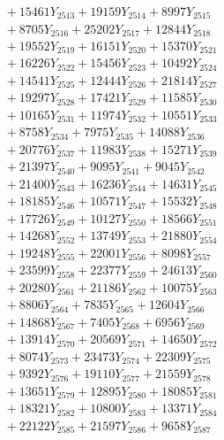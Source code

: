 \documentclass[a4paper,10pt]{article}
\begin{document}
{\begin{align}
&\;  + 15461 Y_{2513} + 19159 Y_{2514} + 8997 Y_{2515} \\[0.3ex]
&\;  + 8705 Y_{2516} + 25202 Y_{2517} + 12844 Y_{2518} \\[0.5ex]\allowbreak
&\;  + 19552 Y_{2519} + 16151 Y_{2520} + 15370 Y_{2521} \\[0.3ex]
&\;  + 16226 Y_{2522} + 15456 Y_{2523} + 10492 Y_{2524} \\[0.3ex]
&\;  + 14541 Y_{2525} + 12444 Y_{2526} + 21814 Y_{2527} \\[0.3ex]
&\;  + 19297 Y_{2528} + 17421 Y_{2529} + 11585 Y_{2530} \\[0.3ex]
&\;  + 10165 Y_{2531} + 11974 Y_{2532} + 10551 Y_{2533} \\[0.3ex]
&\;  + 8758 Y_{2534} + 7975 Y_{2535} + 14088 Y_{2536} \\[0.3ex]
&\;  + 20776 Y_{2537} + 11983 Y_{2538} + 15271 Y_{2539} \\[0.3ex]
&\;  + 21397 Y_{2540} + 9095 Y_{2541} + 9045 Y_{2542} \\[0.3ex]
&\;  + 21400 Y_{2543} + 16236 Y_{2544} + 14631 Y_{2545} \\[0.3ex]
&\;  + 18185 Y_{2546} + 10571 Y_{2547} + 15532 Y_{2548} \\[0.5ex]\allowbreak
&\;  + 17726 Y_{2549} + 10127 Y_{2550} + 18566 Y_{2551} \\[0.3ex]
&\;  + 14268 Y_{2552} + 13749 Y_{2553} + 21880 Y_{2554} \\[0.3ex]
&\;  + 19248 Y_{2555} + 22001 Y_{2556} + 8098 Y_{2557} \\[0.3ex]
&\;  + 23599 Y_{2558} + 22377 Y_{2559} + 24613 Y_{2560} \\[0.3ex]
&\;  + 20280 Y_{2561} + 21186 Y_{2562} + 10075 Y_{2563} \\[0.3ex]
&\;  + 8806 Y_{2564} + 7835 Y_{2565} + 12604 Y_{2566} \\[0.3ex]
&\;  + 14868 Y_{2567} + 7405 Y_{2568} + 6956 Y_{2569} \\[0.3ex]
&\;  + 13914 Y_{2570} + 20569 Y_{2571} + 14650 Y_{2572} \\[0.3ex]
&\;  + 8074 Y_{2573} + 23473 Y_{2574} + 22309 Y_{2575} \\[0.3ex]
&\;  + 9392 Y_{2576} + 19110 Y_{2577} + 21559 Y_{2578} \\[0.5ex]\allowbreak
&\;  + 13651 Y_{2579} + 12895 Y_{2580} + 18085 Y_{2581} \\[0.3ex]
&\;  + 18321 Y_{2582} + 10800 Y_{2583} + 13371 Y_{2584} \\[0.3ex]
&\;  + 22122 Y_{2585} + 21597 Y_{2586} + 9658 Y_{2587} \\[0.3ex]

\end{align}}
\end{document}
